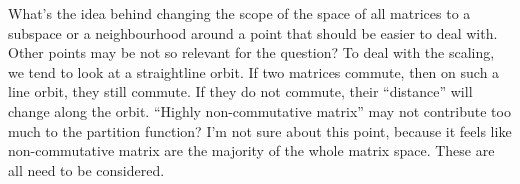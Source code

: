 What's the idea behind changing the scope of the space of all matrices to a subspace or a neighbourhood around a point that should be easier to deal with.
Other points may be not so relevant for the question?
To deal with the scaling, we tend to look at a straightline orbit.
If two matrices commute, then on such a line orbit, they still commute.
If they do not commute, their ``distance'' will change along the orbit.
``Highly non-commutative matrix'' may not contribute too much to the partition function?
I'm not sure about this point, because it feels like non-commutative matrix are the majority of the whole matrix space.
These are all need to be considered.
